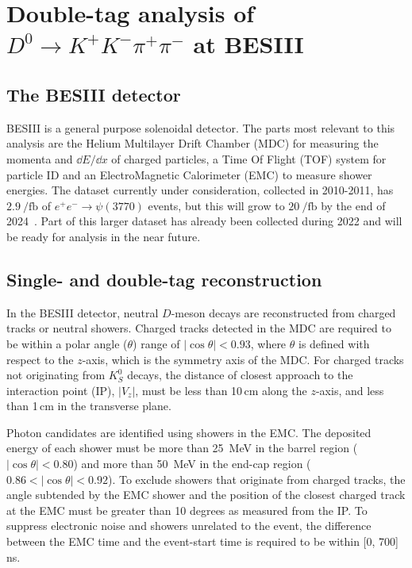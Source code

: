 \documentclass[12pt, a4paper, notitlepage, onecolumn]{article}
\begin{document}
\section{Double-tag analysis of \texorpdfstring{$D^0\to K^+K^-\pi^+\pi^-$}{D2KKpipi} at BESIII}
\subsection{The BESIII detector}
\noindent BESIII \cite{Ablikim:2009aa} is a general purpose solenoidal detector. The parts most relevant to this analysis are the Helium Multilayer Drift Chamber (MDC) for measuring the momenta and $\dd{E}/\dd{x}$ of charged particles, a Time Of Flight (TOF) system for particle ID and an ElectroMagnetic Calorimeter (EMC) to measure shower energies. The dataset currently under consideration, collected in 2010-2011, has $\SI{2.9}{\per\femto\barn}$ of $e^+e^-\to\psi(3770)$ events, but this will grow to $\SI{20}{\per\femto\barn}$ by the end of 2024~\cite{cite:BESIIIWhitePaper}. Part of this larger dataset has already been collected during 2022 and will be ready for analysis in the near future.

\subsection{Single- and double-tag reconstruction}
\noindent In the BESIII detector, neutral $D$-meson decays are reconstructed from charged tracks or neutral showers. Charged tracks detected in the MDC are required to be within a polar angle ($\theta$) range of $|\!\cos\theta|<0.93$, where $\theta$ is defined with respect to the $z$-axis, which is the symmetry axis of the MDC. For charged tracks not originating from $K_S^0$ decays, the distance of closest approach to the interaction point (IP), $|V_{z}|$, must be less than 10\,cm along the $z$-axis, and less than 1\,cm in the transverse plane.

Photon candidates are identified using showers in the EMC. The deposited energy of each shower must be more than 25~MeV in the barrel region ($|\cos \theta|< 0.80$) and more than 50~MeV in the end-cap region ($0.86 <|\!\cos \theta|< 0.92$). To exclude showers that originate from charged tracks, the angle subtended by the EMC shower and the position of the closest charged track at the EMC must be greater than 10 degrees as measured from the IP. To suppress electronic noise and showers unrelated to the event, the difference between the EMC time and the event-start time is required to be within [0, 700]\,ns.
\end{document}
